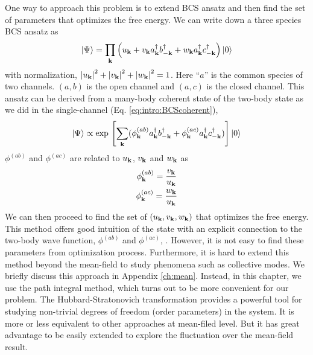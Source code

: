 One way to approach this problem is to extend BCS ansatz and then find the set of parameters that optimizes the free energy.  We can write down a  three species BCS ansatz as 
\begin{equation}\label{eq:pathInt2:ansatz}
\left|\Psi\right>=\prod_{\mathbf{k}}\left(u_{\mathbf{k}}+v_{\mathbf{k}}{}a^{\dagger}_{\mathbf{k}}{}b^{\dagger}_{-\mathbf{k}}+w_{\mathbf{k}}{}a^{\dagger}_{\mathbf{k}}{}c^{\dagger}_{-\mathbf{k}}\right)\left|0\right>
\end{equation} 
with normalization, $\left\lvert{u_{\ensuremath{\mathbf{k}}}}\right\rvert^2+\left\lvert{v_{\ensuremath{\mathbf{k}}}}\right\rvert^2+\left\lvert{w_{\ensuremath{\mathbf{k}}}}\right\rvert^2=1$.   Here ``$a$'' is the common species of two channels. $(a,b)$ is the open channel and $(a,c)$ is the closed channel.  This ansatz can be derived from a many-body coherent state of the two-body state as we did in the single-channel (Eq. \ref{eq:intro:BCScoherent}), 
\begin{equation}\label{eq:pathInt2:ansatzCoh}
\left|\Psi\right>\propto\exp{}\left[\sum_{\mathbf{k}}(\phi^{(ab)}_{\mathbf{k}}{}a^{\dagger}_{\mathbf{k}}{}b^{\dagger}_{-\mathbf{k}}+\phi^{(ac)}_{\mathbf{k}}{}a^{\dagger}_{\mathbf{k}}{}c^{\dagger}_{-\mathbf{k}})\right]\left|0\right>
\end{equation} 
$\phi^{(ab)}$ and $\phi^{(ac)}$ are related to $u_{\mathbf{k}}$, $v_{\mathbf{k}}$ and $w_{\mathbf{k}}$ as  
\begin{gather}
\phi_{\mathbf{k}}^{(ab)}=\frac{v_{\mathbf{k}}}{u_{\mathbf{k}}}\\
\phi_{\mathbf{k}}^{(ac)}=\frac{w_{\mathbf{k}}}{u_{\mathbf{k}}}\label{eq:pathInt2:phiWU}
\end{gather}
 We can then proceed to find the set of $(u_{\mathbf{k}},v_{\mathbf{k}},w_{\mathbf{k}})$ that optimizes the free energy. This method offers good intuition of the state  with an explicit connection to the two-body wave function, $\phi^{(ab)}$ and $\phi^{(ac)}$, .  However,  it is not easy to find these parameters from optimization process. Furthermore, it is hard to extend this method beyond the mean-field to study phenomena such as collective modes.  We briefly discuss this approach in Appendix \ref{ch:mean}. Instead, in this chapter, we use the path integral method, which turns out to be  more convenient for our problem.   The Hubbard-Stratonovich transformation provides a powerful tool for studying non-trivial degrees of freedom (order parameters) in the system.  It is more or less equivalent to other approaches at mean-filed level. But it has great advantage to be easily extended to explore the fluctuation over the mean-field result.  

